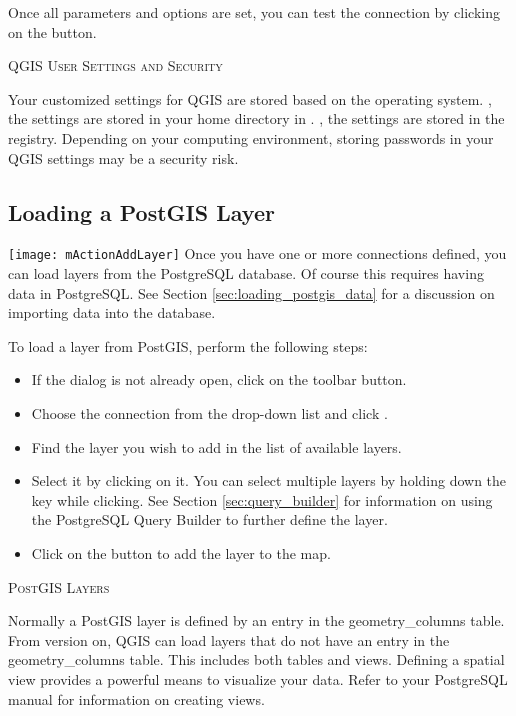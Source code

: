 Once all parameters and options are set, you can test the connection by
clicking on the  button.

\begin{Tip}\caption{\textsc{QGIS User Settings and
Security}}
Your customized settings for QGIS are stored based on the operating
system. \nix, the settings are stored in your home directory in
. \win, the settings are stored in the registry. Depending on
your computing environment, storing passwords in your QGIS settings may be a
security risk.
\end{Tip}

\subsection{Loading a PostGIS Layer}

\texttt{[image: mActionAddLayer]} Once you have one or more
connections defined, you can load layers from the PostgreSQL database. Of
course this requires having data in PostgreSQL. See Section
\ref{sec:loading_postgis_data} for a discussion on importing data into the
database. 

To load a layer from PostGIS, perform the following steps:

\begin{itemize}[label=--]
\item If the  dialog is not already open, click on the
 toolbar button.
\item Choose the connection from the drop-down list and click .
\item Find the layer you wish to add in the list of available layers.
\item Select it by clicking on it. You can select multiple layers by holding
down the  key while clicking. See Section \ref{sec:query_builder} for
information on using the PostgreSQL Query Builder to further define the layer.
\item Click on the  button to add the layer to the map.
\end{itemize}

\begin{Tip}\caption{\textsc{PostGIS Layers}}
Normally a PostGIS layer is defined by an entry in the
geometry\_columns table. From version \OLD %
on, QGIS can load layers that do not have
an entry in the geometry\_columns table. This includes both tables and views.
Defining a spatial view provides a powerful means to visualize your data. Refer
to your PostgreSQL manual for information on creating views.
\end{Tip}

